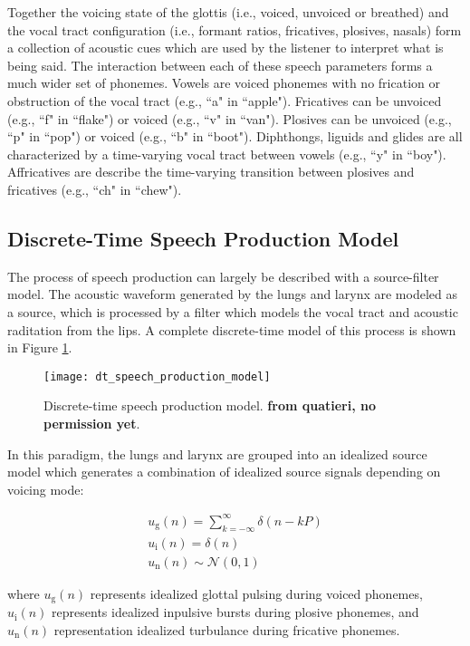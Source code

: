 Together the voicing state of the glottis (i.e., voiced, unvoiced or breathed) and the vocal tract configuration (i.e., formant ratios, fricatives, plosives, nasals) form a collection of acoustic cues which are used by the listener to interpret what is being said.  The interaction between each of these speech parameters forms a much wider set of phonemes. Vowels are voiced phonemes with no frication or obstruction of the vocal tract (e.g., ``a" in ``apple"). Fricatives can be unvoiced (e.g., ``f" in ``flake") or voiced (e.g., ``v" in ``van"). Plosives can be unvoiced (e.g., ``p" in ``pop") or voiced (e.g., ``b" in ``boot"). Diphthongs, liguids and glides are all characterized by a time-varying vocal tract between vowels (e.g., ``y" in ``boy"). Affricatives are describe the time-varying transition between plosives and fricatives (e.g., ``ch" in ``chew").

\subsection{Discrete-Time Speech Production Model} \label{dt_speech_model}

The process of speech production can largely be described with a source-filter model. The acoustic waveform generated by the lungs and larynx are modeled as a source, which is processed by a filter which models the vocal tract and acoustic raditation from the lips. A complete discrete-time model of this process is shown in Figure \ref{fig:dt_speech_production_model}.

\begin{figure}[H]
	\centering
	\texttt{[image: dt\_speech\_production\_model]}
	\caption[Discrete-time speech production model]{Discrete-time speech production model. \textbf{from quatieri, no permission yet}.}
	\label{fig:dt_speech_production_model}
\end{figure}

In this paradigm, the lungs and larynx are grouped into an idealized source model which generates a combination of idealized source signals depending on voicing mode:

\begin{eqnarray}
	u_\mathrm{g}(n)=\sum_{k=-\infty}^{\infty} \delta(n-kP) \\
	u_\mathrm{i}(n)=\delta(n) \\
	u_\mathrm{n}(n)\sim\mathcal{N}(0,1)
\end{eqnarray}


\noindent
where $u_\mathrm{g}(n)$ represents idealized glottal pulsing during voiced phonemes, $u_\mathrm{i}(n)$ represents idealized inpulsive bursts during plosive phonemes, and $u_\mathrm{n}(n)$  representation idealized turbulance during fricative phonemes. 

